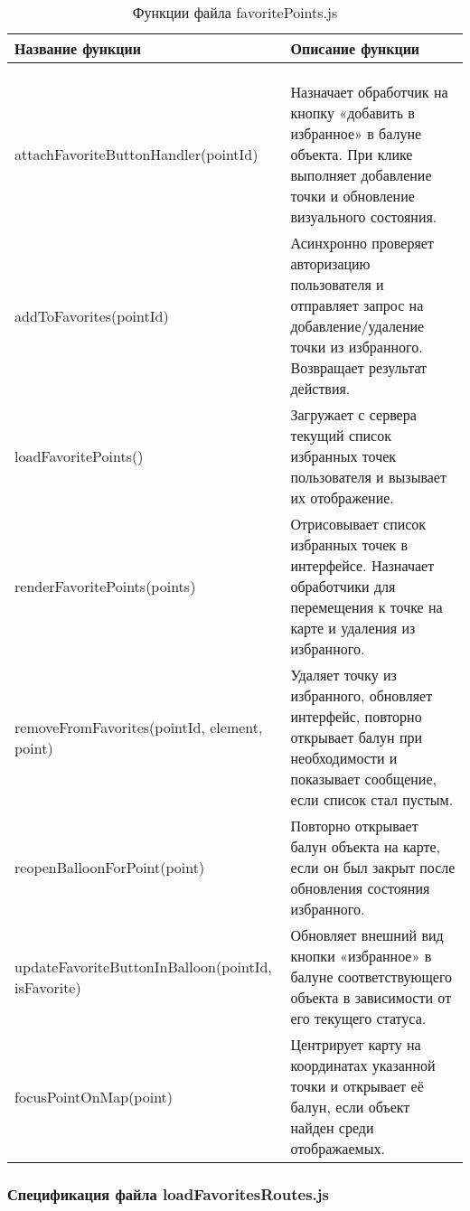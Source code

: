 \renewcommand{\arraystretch}{0.8} %
\begin{xltabular}{\textwidth}{|l|X|}
	\caption{Функции файла favoritePoints.js\label{class:rtable4}}\\
	\hline \centrow Название функции & \centrow Описание функции\\
	\hline {} & \\ \hline
	\endfirsthead
	\\
	\hline {} & \\ \hline
	\finishhead
	attachFavoriteButtonHandler(pointId) & Назначает обработчик на кнопку «добавить в избранное» в балуне объекта. При клике выполняет добавление точки и обновление визуального состояния.\\
	\hline addToFavorites(pointId) & Асинхронно проверяет авторизацию пользователя и отправляет запрос на добавление/удаление точки из избранного. Возвращает результат действия.\\
	\hline loadFavoritePoints() & Загружает с сервера текущий список избранных точек пользователя и вызывает их отображение.\\
	\hline renderFavoritePoints(points) & Отрисовывает список избранных точек в интерфейсе. Назначает обработчики для перемещения к точке на карте и удаления из избранного.\\
	\hline removeFromFavorites(pointId, element, point) & Удаляет точку из избранного, обновляет интерфейс, повторно открывает балун при необходимости и показывает сообщение, если список стал пустым.\\
	\hline reopenBalloonForPoint(point) & Повторно открывает балун объекта на карте, если он был закрыт после обновления состояния избранного.\\
	\hline updateFavoriteButtonInBalloon(pointId, isFavorite) & Обновляет внешний вид кнопки «избранное» в балуне соответствующего объекта в зависимости от его текущего статуса.\\
	\hline focusPointOnMap(point) & Центрирует карту на координатах указанной точки и открывает её балун, если объект найден среди отображаемых.\\
\end{xltabular}

\subsubsection{Спецификация файла loadFavoritesRoutes.js}

